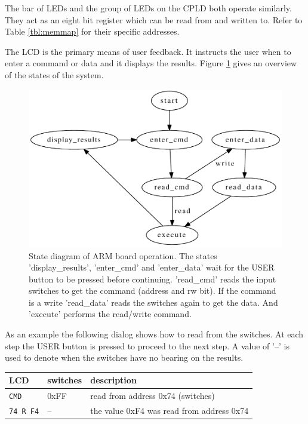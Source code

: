 \documentclass{article}
\begin{document}
The bar of LEDs and the group of LEDs on the CPLD both operate
similarly.
They act as an eight bit register which can be read from and written to.
Refer to Table \ref{tbl:memmap} for their specific addresses.

The LCD is the primary means of user feedback.
It instructs the user when to enter a command or data and
it displays the results.
Figure \ref{fig:armstate} gives an overview of the states of
the system.

\begin{figure}[hbp]
\center
\includegraphics[scale=0.8]{figures/arm-state_diagram/arm-state_diagram}
\caption{State diagram of ARM board operation.
The states 'display\_results', 'enter\_cmd' and 'enter\_data'
wait for the USER button to be pressed before continuing.
'read\_cmd' reads the input switches to get the command (address and rw bit).
If the command is a write 'read\_data' reads the switches again to get the data.
And 'execute' performs the read/write command.
}
\label{fig:armstate}
\end{figure}

As an example the following dialog shows how to read from
the switches.
At each step the USER button is pressed to proceed to the next step.
A value of '--' is used to denote when the switches have no bearing
on the results.

\begin{tabular}{l l l}
LCD & switches & description \\
\hline
\verb+CMD+ & 0xFF & read from address 0x74 (switches) \\
\verb+74 R F4+ & -- & the value 0xF4 was read from address 0x74 \\
\end{tabular}
\end{document}

